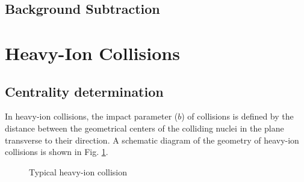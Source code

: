\subsection{Background Subtraction}

\section{Heavy-Ion Collisions}
\label{sec:heavyIonCollisions}


\subsection{Centrality determination} \label{sect:CentEP}
In heavy-ion collisions, the impact parameter (\(b\)) of collisions is defined by the distance between the geometrical centers of the colliding nuclei in the plane transverse to their direction. A schematic diagram of the geometry of heavy-ion collisions is shown in Fig. \ref{fig:hictikz}. 
\begin{figure}[htbp]
	\centering
	\caption{Typical heavy-ion collision}
	\label{fig:hictikz}
\end{figure}
